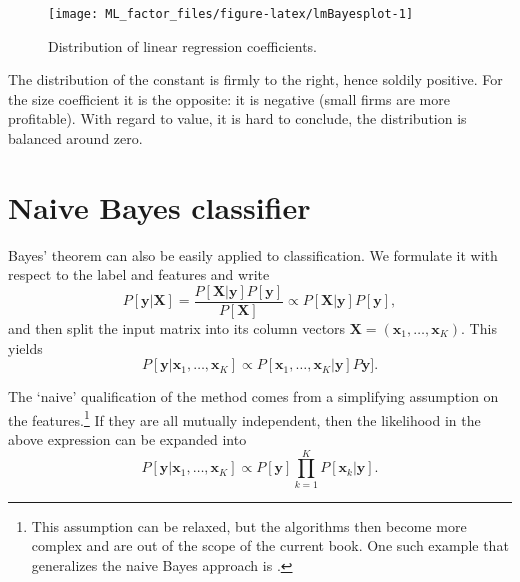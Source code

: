 \documentclass[]{krantz}
\let\rmarkdownfootnote\footnote%
\def\footnote{\protect\rmarkdownfootnote}
\theoremstyle{definition}
\theoremstyle{definition}
\theoremstyle{definition}
\theoremstyle{remark}
\begin{document}
\begin{figure}[H]

{\centering \texttt{[image: ML\_factor\_files/figure-latex/lmBayesplot-1]} 

}

\caption{Distribution of linear regression coefficients.}\label{fig:lmBayesplot}
\end{figure}

\normalsize

The distribution of the constant is firmly to the right, hence soldily
positive. For the size coefficient it is the opposite: it is negative
(small firms are more profitable). With regard to value, it is hard to
conclude, the distribution is balanced around zero.

\hypertarget{naive-bayes-classifier}{%
\section{Naive Bayes classifier}\label{naive-bayes-classifier}}

Bayes' theorem can also be easily applied to classification. We
formulate it with respect to the label and features and write
\begin{equation}
\label{eq:naivebayes}
P[\textbf{y} | \textbf{X}] = \frac{P[ \textbf{X} | \textbf{y}]P[\textbf{y}]}{P[\textbf{X}]} \propto P[ \textbf{X} | \textbf{y}]P[\textbf{y}],
\end{equation} and then split the input matrix into its column vectors
\(\textbf{X}=(\textbf{x}_1,\dots,\textbf{x}_K)\). This yields
\begin{equation}
\label{eq:naivebayes2}
P[\textbf{y} | \textbf{x}_1,\dots,\textbf{x}_K] \propto P[\textbf{x}_1,\dots,\textbf{x}_K| \textbf{y}]P\textbf{y}].
\end{equation}

The `naive' qualification of the method comes from a simplifying
assumption on the features.\footnote{This assumption can be relaxed, but
  the algorithms then become more complex and are out of the scope of
  the current book. One such example that generalizes the naive Bayes
  approach is \citet{friedman1997bayesian}.} If they are all mutually
independent, then the likelihood in the above expression can be expanded
into \begin{equation}
\label{eq:naivebayes3}
P[\textbf{y} | \textbf{x}_1,\dots,\textbf{x}_K] \propto P[\textbf{y}]\prod_{k=1}^K P[\textbf{x}_k| \textbf{y}].
\end{equation}
\end{document}
